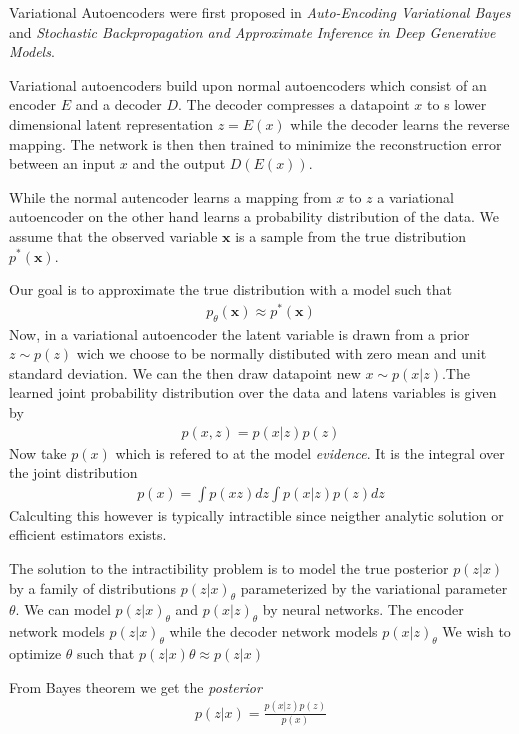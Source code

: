 Variational Autoencoders were first proposed in \textit{Auto-Encoding Variational Bayes} \cite{vae1} and \textit{Stochastic Backpropagation and Approximate Inference in Deep Generative Models}. \cite{vae2}

Variational autoencoders build upon normal autoencoders which consist of an encoder $E$ and a decoder $D$. The decoder compresses a datapoint $x$ to s lower dimensional latent representation $z = E(x)$ while the decoder learns the reverse mapping. The network is then then trained to minimize the reconstruction error between an input $x$ and the output $D(E(x))$. 

While the normal autencoder learns a mapping from $x$ to $z$ a variational autoencoder on the other hand learns a probability distribution of the data. 
We assume that the observed variable $\mathbf{x}$ is a sample from the true distribution $p^*(\mathbf{x})$.\cite{vaeintro} 

Our goal is to approximate the true distribution with a model such that
\begin{align}
  p_\theta(\mathbf{x})\approx p^*(\mathbf{x})
\end{align}
Now, in a variational autoencoder the latent variable is drawn from a prior $z\sim p(z)$ wich we choose to be normally distibuted with zero mean and unit standard deviation. We can the then draw datapoint new $x\sim p(x|z)$.The learned joint probability distribution over the data and latens variables is given by
\begin{align}
    p(x,z)=p(x|z)p(z)
\end{align}
Now take $p(x)$ which is refered to at the model \emph{evidence}. It is the integral over the joint distribution
\begin{align}
    p(x)= \int p(xz)dz \int p(x|z) p(z)dz 
    \label{evidence}
\end{align}
Calculting this however is typically intractible since neigther analytic solution or efficient estimators exists. \cite{vaeintro} 

The solution to the intractibility problem is to model the true posterior $p(z|x)$ by a family of distributions $p(z|x)_\theta$ parameterized by the variational parameter $\theta$. We can model $p(z|x)_\theta$ and $p(x|z)_\theta$ by neural networks. The encoder network models $p(z|x)_\theta$ while the decoder network models $p(x|z)_\theta$ We wish to optimize $\theta$ such that $p(z|x)\theta \approx p(z|x)$

From Bayes theorem we get the \emph{posterior}  
\begin{align}
    p(z|x) =\frac{p(x|z)p(z)}{p(x)}
\end{align}

